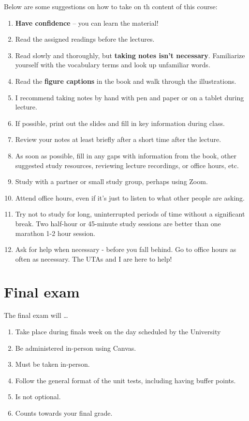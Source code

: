 \documentclass[
]{book}
\providecommand{\tightlist}{%
  \setlength{\itemsep}{0pt}\setlength{\parskip}{0pt}}
\begin{document}
Below are some suggestions on how to take on th content of this course:

\begin{enumerate}
\def\labelenumi{\arabic{enumi}.}
\tightlist
\item
  \textbf{Have confidence} -- you can learn the material!\\
\item
  Read the assigned readings before the lectures.
\item
  Read slowly and thoroughly, but \textbf{taking notes isn't necessary}. Familiarize yourself with the vocabulary terms and look up unfamiliar words.
\item
  Read the \textbf{figure captions} in the book and walk through the illustrations.
\item
  I recommend taking notes by hand with pen and paper or on a tablet during lecture.
\item
  If possible, print out the slides and fill in key information during class.
\item
  Review your notes at least briefly after a short time after the lecture.
\item
  As soon as possible, fill in any gaps with information from the book, other suggested study resources, reviewing lecture recordings, or office hours, etc.
\item
  Study with a partner or small study group, perhaps using Zoom.
\item
  Attend office hours, even if it's just to listen to what other people are asking.
\item
  Try not to study for long, uninterrupted periods of time without a significant break.
  Two half-hour or 45-minute study sessions are better than one marathon 1-2 hour session.
\item
  Ask for help when necessary - before you fall behind. Go to office hours as often as necessary. The UTAs and I are here to help!
\end{enumerate}

\hypertarget{final-exam}{%
\chapter{Final exam}\label{final-exam}}

The final exam will \ldots{}

\begin{enumerate}
\def\labelenumi{\arabic{enumi}.}
\tightlist
\item
  Take place during finals week on the day scheduled by the University
\item
  Be administered in-person using Canvas.
\item
  Must be taken in-person.
\item
  Follow the general format of the unit tests, including having buffer points.
\item
  Is not optional.
\item
  Counts towards your final grade.
\end{enumerate}
\end{document}
